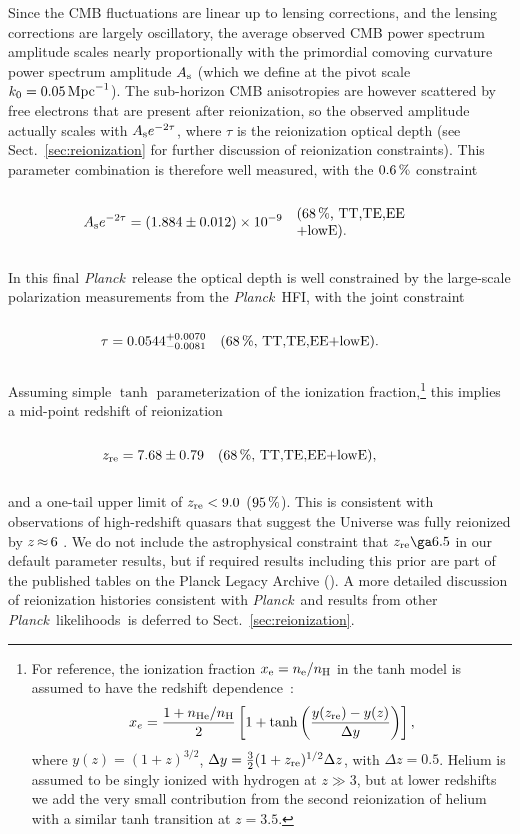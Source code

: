 \documentclass[longauth,traditabstract]{aa}
\def\Planck{\textit{Planck}}
\def\,{\thinspace}
\newcommand{\leftparbox}[2]{\parbox{#1}{\begin{flushleft} #2 \end{flushleft}}}
\newcommand{\oneonesig}[4][5cm]{
\begin{equation}
\left.
  #2 \quad\mbox{\text{\leftparbox{#1}{(68\,\%,~#3)#4}}}
  \right.
\end{equation}
}
\newcommand{\mksym}[1]{\ifmmode {\rm #1}\else #1\fi}
\newcommand{\dataplus}{\allowbreak+}
\newcommand{\TTTEEE}{\mksym{TT,TE,EE}}
\newcommand{\lowE}{\mksym{lowE}}
\newcommand{\shortall}{\TTTEEE\dataplus\lowE}
\newcommand{\As}{A_{\rm s}}
\newcommand{\zre}{z_{\text{re}}}
\providecommand{\text}[1]{\rm{#1}}
\newcommand{\Mpc}{\text{Mpc}}
\newcommand{\PLA}{\citetalias{PLA}}
\newcommand{\planck}{\Planck}
\begin{document}
Since the CMB fluctuations are linear up to lensing corrections, and the lensing corrections are largely oscillatory, the average observed CMB power spectrum amplitude scales nearly proportionally with the primordial comoving curvature power spectrum amplitude $\As$ (which we define at the pivot scale $k_0=0.05\,{\Mpc}^{-1}$). The sub-horizon CMB anisotropies are however scattered by free electrons that are present after reionization, so the observed amplitude actually scales with $\As e^{-2\tau}$, where $\tau$ is the reionization optical depth (see Sect.~\ref{sec:reionization} for further discussion of reionization constraints).
This parameter combination is therefore well measured, with the $0.6\,\%$ constraint
\oneonesig[3.5cm]{\As e^{-2\tau} = (1.884 \pm 0.012)\times 10^{-9}}{\shortall}{.}
In this final \planck\ release the optical depth is well constrained by the large-scale polarization measurements from the \Planck\ HFI, with the joint constraint
\oneonesig{\tau = 0.0544^{+0.0070}_{-0.0081}}{\shortall}{.}
Assuming simple $\tanh$ parameterization of the ionization
fraction,\footnote{\label{footnote:tanh}For reference, the ionization fraction $x_{\rm e}=n_{\rm e}/n_{\rm H}$ in the tanh model
is assumed to have the redshift dependence~\citep{Lewis:2008wr}:
$$
x_e = {1+ n_{\rm He}/n_{\rm H} \over 2} \left [ 1 + {\rm tanh} \left ( {y(z_{\rm re}) - y(z) \over \Delta y} \right ) \right ], \nonumber
$$
where $y(z) = (1 + z)^{3/2}$, $\Delta y = \frac{3}{2}(1+z_{\rm re})^{1/2} \Delta z$, with $\Delta z = 0.5$.  Helium is assumed to be singly ionized with hydrogen at $z\gg 3$, but at lower redshifts we add the very small contribution from the second reionization of helium with a similar tanh transition at $z=3.5$.
}
 this implies a mid-point redshift of reionization
\oneonesig{\zre = 7.68 \pm 0.79}{\shortall}{,}
and a one-tail upper limit of $\zre < 9.0$ ($95\,\%$).
This is consistent with observations of high-redshift quasars that suggest the Universe was fully reionized by $z\,{\approx}\,6$ \citep{bouwens2015}. We do not include the astrophysical constraint that $\zre \ga 6.5$ in our default parameter results, but if required results including this prior are part of the published tables on the Planck Legacy Archive (\PLA).
A more detailed discussion of reionization histories consistent with \planck\ and results from other \planck\ likelihoods\ is deferred to Sect.~\ref{sec:reionization}.
\end{document}
